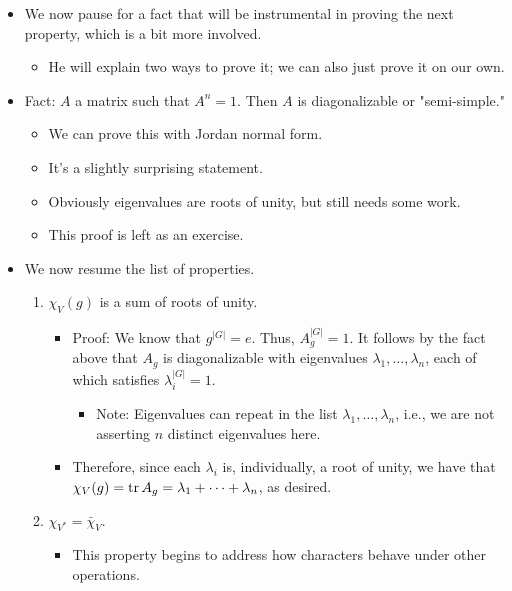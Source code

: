\documentclass[../notes.tex]{subfiles}
\begin{document}
\begin{itemize}
\begin{enumerate}
\begin{itemize}
\begin{equation*}
            \end{equation*}
        \end{itemize}
    \end{enumerate}
    \item We now pause for a fact that will be instrumental in proving the next property, which is a bit more involved.
    \begin{itemize}
        \item He will explain two ways to prove it; we can also just prove it on our own.
    \end{itemize}
    \item Fact: $A$ a matrix such that $A^n=1$. Then $A$ is diagonalizable or "semi-simple."
    \begin{itemize}
        \item We can prove this with Jordan normal form.
        \item It's a slightly surprising statement.
        \item Obviously eigenvalues are roots of unity, but still needs some work.
        \item This proof is left as an exercise.
    \end{itemize}
    \item We now resume the list of properties.
    \begin{enumerate}[resume]
        \item $\chi_V(g)$ is a sum of roots of unity.
        \begin{itemize}
            \item Proof: We know that $g^{|G|}=e$. Thus, $A_g^{|G|}=1$. It follows by the fact above that $A_g$ is diagonalizable with eigenvalues $\lambda_1,\dots,\lambda_n$, each of which satisfies $\lambda_i^{|G|}=1$.
            \begin{itemize}
                \item Note: Eigenvalues can repeat in the list $\lambda_1,\dots,\lambda_n$, i.e., we are not asserting $n$ distinct eigenvalues here.
            \end{itemize}
            \item Therefore, since each $\lambda_i$ is, individually, a root of unity, we have that $\chi_V(g)=\tr A_g=\lambda_1+\cdots+\lambda_n$, as desired.
        \end{itemize}
        \item $\chi_{V^*}=\bar{\chi}_V$.
        \begin{itemize}
            \item This property begins to address how characters behave under other operations.

\end{itemize}
\end{enumerate}
\end{itemize}
\end{document}
